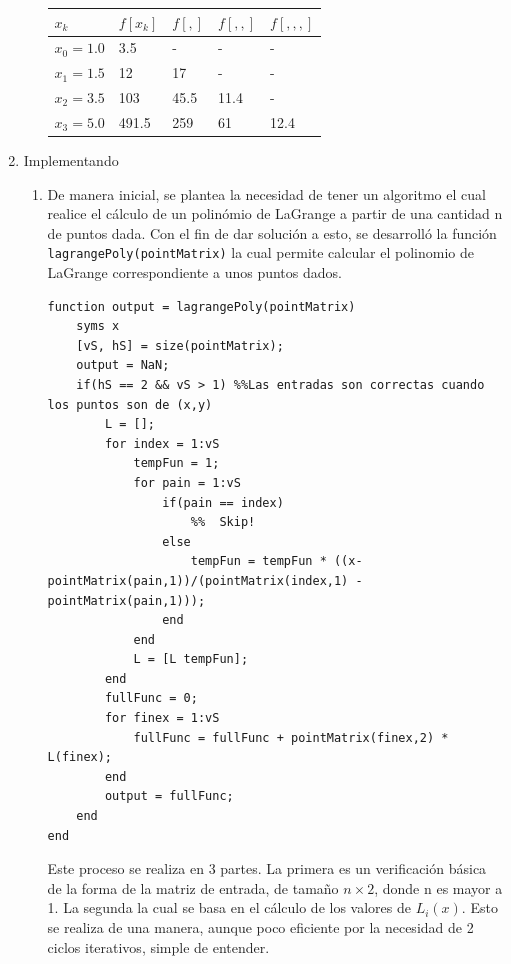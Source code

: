 \documentclass[english,notitlepage,letterpaper, 10pt]{article} %
\begin{document}
\begin{enumerate}
\begin{enumerate}
\begin{center}
\begin{table}[H]
\begin{tabular}{|p{1.5cm}|p{1.5cm}|p{1.5cm}|p{1.5cm}|p{1.5cm}|}
           \hline  
           $x_k$ & $f[x_k]$ & $f[,]$ & $f[,,]$ & $f[,,,]$    \\ \hline
          $x_0 = 1.0$ & 3.5   & -      & -       & -         \\ \hline
          $x_1 = 1.5$ & 12    & 17     & -       & -         \\ \hline
          $x_2 = 3.5$ & 103   & 45.5   & 11.4    & -         \\ \hline
          $x_3 = 5.0$ & 491.5 & 259    & 61      & 12.4      \\ \hline
    
          \end{tabular}
        \end{table}
      \end{center}
      
    \end{enumerate}
    
    \item Implementando
    
    \begin{enumerate}
      \item De manera inicial, se plantea la necesidad de tener un algoritmo el cual realice el cálculo de un polinómio de LaGrange a partir de una cantidad n de puntos dada. Con el fin de dar solución a esto, se desarrolló la función \texttt{lagrangePoly(pointMatrix)} la cual permite calcular el polinomio de LaGrange correspondiente a unos puntos dados.
      
      \begin{lstlisting}
function output = lagrangePoly(pointMatrix)
    syms x
    [vS, hS] = size(pointMatrix);
    output = NaN;
    if(hS == 2 && vS > 1) %%Las entradas son correctas cuando los puntos son de (x,y)
        L = [];
        for index = 1:vS
            tempFun = 1;
            for pain = 1:vS
                if(pain == index)
                    %%  Skip!
                else
                    tempFun = tempFun * ((x-pointMatrix(pain,1))/(pointMatrix(index,1) - pointMatrix(pain,1)));
                end
            end
            L = [L tempFun];
        end
        fullFunc = 0;
        for finex = 1:vS
            fullFunc = fullFunc + pointMatrix(finex,2) * L(finex);
        end
        output = fullFunc;
    end
end
      \end{lstlisting}

      Este proceso se realiza en 3 partes. La primera es un verificación básica de la forma de la matriz de entrada, de tamaño $n \times 2$, donde n es mayor a 1. La segunda la cual se basa en el cálculo de los valores de $L_i(x)$. Esto se realiza de una manera, aunque poco eficiente por la necesidad de 2 ciclos iterativos, simple de entender. 


\end{enumerate}
\end{enumerate}
\end{document}
